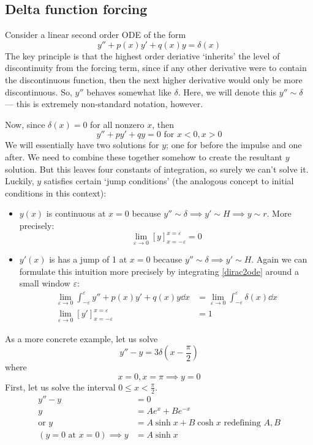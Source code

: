\subsection{Delta function forcing}
Consider a linear second order ODE of the form
\begin{equation}\label{dirac2ode}
	y'' + p(x)y' + q(x)y = \delta(x)
\end{equation}
The key principle is that the highest order deriative `inherits' the level of discontinuity from the forcing term, since if any other derivative were to contain the discontinuous function, then the next higher derivative would only be more discontinuous.
So, \(y''\) behaves somewhat like \(\delta\).
Here, we will denote this \(y'' \sim \delta\) --- this is extremely non-standard notation, however.

Now, since \(\delta(x) = 0\) for all nonzero \(x\), then
\[
	y''+py'+qy=0 \text{ for } x<0, x>0
\]
We will essentially have two solutions for \(y\); one for before the impulse and one after.
We need to combine these together somehow to create the resultant \(y\) solution.
But this leaves four constants of integration, so surely we can't solve it.
Luckily, \(y\) satisfies certain `jump conditions' (the analogous concept to initial conditions in this context):
\begin{itemize}
	\item \(y(x)\) is continuous at \(x=0\) because \(y'' \sim \delta \implies y' \sim H \implies y \sim r\).
	      More precisely:
	      \[
		      \lim_{\varepsilon \to 0} [y]_{x=-\varepsilon}^{x=\varepsilon} = 0
	      \]
	\item \(y'(x)\) is has a jump of 1 at \(x=0\) because \(y'' \sim \delta \implies y' \sim H\).
	      Again we can formulate this intuition more precisely by integrating \eqref{dirac2ode} around a small window \(\varepsilon\):
	      \begin{align*}
		      \lim_{\varepsilon \to 0} \int_{-\varepsilon}^\varepsilon y'' + p(x)y' + q(x)y \dd{x} & = \lim_{\varepsilon \to 0} \int_{-\varepsilon}^\varepsilon \delta(x) \dd{x} \\
		      \lim_{\varepsilon \to 0} [y']_{x=-\varepsilon}^{x=\varepsilon}                       & = 1
	      \end{align*}
\end{itemize}
As a more concrete example, let us solve
\[
	y'' - y = 3 \delta\left(x - \frac{\pi}{2}\right)
\]
where
\[
	x = 0, x = \pi \implies y = 0
\]
First, let us solve the interval \(0 \leq x < \frac{\pi}{2}\).
\begin{align*}
	y'' - y                              & = 0                                              \\
	y                                    & = Ae^x + Be^{-x}                                 \\
	\text{or } y                         & = A \sinh x + B \cosh x \text{ redefining } A, B \\
	(y = 0 \text{ at } x = 0) \implies y & = A \sinh x
\end{align*}
